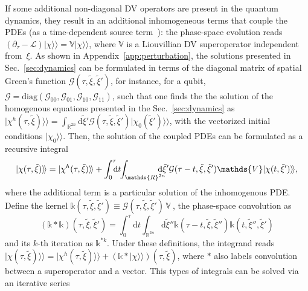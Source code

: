 \documentclass[%
reprint,
superscriptaddress,
nofootinbib,
 amsmath,amssymb,
prx,
floatfix,
]{revtex4-2}
\newcommand{\dket}[1]{\lvert #1 \rangle\!\rangle}
\begin{document}
If some additional non-diagonal DV operators are present in the quantum dynamics, they result in an additional inhomogeneous terms that couple the PDEs (as a time-dependent source term~\cite{Antonakakis_close_2013}): the phase-space evolution reads $\left( \partial_\tau - \mathcal{L} \right) \dket{\chi} = \mathds{V}\dket{\chi}$, 
where  $\mathds{V}$ is a Liouvillian DV superoperator independent from~$\xi$. As shown in Appendix~\ref{app:perturbation}, the solutions presented in Sec.~\ref{sec:dynamics} can be formulated in terms of the diagonal matrix of spatial Green's function  $\mathcal{G}(\tau,  \tilde{\xi}, \tilde{\xi}')$, for instance, for a qubit, $\mathcal{G}= \text{diag} (\mathcal{G}_{00}, \mathcal{G}_{01},\mathcal{G}_{10},\mathcal{G}_{11})$, such that one finds the the solution of the homogenous equations presented in the Sec.~\ref{sec:dynamics} as $\dket{\chi^{h} (\tau, \tilde{\xi})} = \int_{\mathds{R}^{2n}} \text{d} \tilde{\xi}' \mathcal{G}(\tau,  \tilde{\xi}, \tilde{\xi}') \dket{\chi_0(\tilde{\xi}')}$, with the vectorized initial conditions $\dket{\chi_0}$. Then, the solution of the coupled PDEs can be formulated as a recursive integral~\cite{Gripenberg1990}
\begin{equation}
\label{eq:volterra}
    \dket{\chi(\tau, \tilde{\xi})} = \dket{\chi^{h} (\tau, \tilde{\xi})}  + \int_0^\tau\hspace*{-2mm} \text{d} t \hspace*{-1mm}\int_{\mathds{R}^{2n}}\hspace*{-4mm} \text{d} \tilde{\xi}' \mathcal{G}(\tau - t ,  \tilde{\xi}, \tilde{\xi}') \mathds{V} \dket{\chi(t,\tilde{\xi}')},  \nonumber
\end{equation}
where the additional term is a particular solution of the inhomogenous PDE. 
Define the kernel $\mathds{k}(\tau, \tilde{\xi}, \tilde{\xi}') \equiv \mathcal{G}(\tau,\tilde{\xi},\tilde{\xi}')\,\mathds{V}\ $, the phase-space convolution as 
\begin{equation}
    (\mathds{k}*\mathds{k})(\tau, \tilde{\xi}, \tilde{\xi}') = \int_0^\tau \text{d} t \int_{\mathds{R}^{2n}} \text{d} \tilde{\xi}'' \mathds{k}(\tau- t, \tilde{\xi}, \tilde{\xi}'')\mathds{k}(t, \tilde{\xi}'', \tilde{\xi}') \nonumber
\end{equation}
and its $k$-th iteration as $\mathds{k}^{* k}.$
Under these definitions, the integrand reads $\dket{\chi(\tau,\tilde \xi)}=\dket{\chi^{h}(\tau,\tilde \xi)}+(\mathds{k}*\dket{\chi})(\tau,\tilde \xi)$, where $*$ also labels convolution between a superoperator and a vector. This types of integrals can be solved via an iterative series~\cite{Gripenberg1990}
\end{document}
